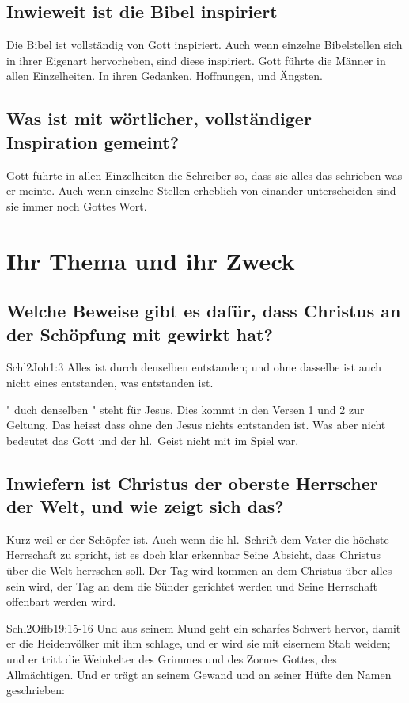 \subsection{Inwieweit ist die Bibel inspiriert}
Die Bibel ist vollständig von Gott inspiriert. Auch wenn einzelne Bibelstellen sich in ihrer Eigenart hervorheben, sind diese inspiriert. Gott führte die Männer in allen Einzelheiten. In ihren Gedanken, Hoffnungen, und Ängsten.
\subsection{Was ist mit wörtlicher, vollständiger Inspiration gemeint?}
Gott führte in allen Einzelheiten die Schreiber so, dass sie alles das schrieben was er meinte. Auch wenn einzelne Stellen erheblich von einander unterscheiden sind sie immer noch Gottes Wort.
\section{Ihr Thema und ihr Zweck}
\subsection{Welche Beweise gibt es dafür, dass Christus an der Schöpfung mit gewirkt hat?}
\begin{bibeltext}{Schl2}{Joh}{1:3}
	Alles ist durch denselben entstanden; und ohne dasselbe ist auch nicht eines entstanden, was entstanden ist.
\end{bibeltext}
" duch denselben " steht für Jesus. Dies kommt in den Versen 1 und 2 zur Geltung. Das heisst dass ohne den Jesus nichts entstanden ist. Was aber nicht bedeutet das Gott und der hl.\ Geist nicht mit im Spiel war.
\subsection{Inwiefern ist Christus der oberste Herrscher der Welt, und wie zeigt sich das?}
	Kurz weil er der Schöpfer ist. Auch wenn die hl.\ Schrift dem Vater die höchste Herrschaft zu spricht, ist es doch klar erkennbar Seine Absicht, dass Christus über die Welt herrschen soll. Der Tag wird kommen an dem Christus über alles sein wird, der Tag an dem die Sünder gerichtet werden und Seine Herrschaft offenbart werden wird.
	\begin{bibeltext}{Schl2}{Offb}{19:15-16}
		Und aus seinem Mund geht ein scharfes Schwert hervor, damit er die Heidenvölker mit ihm schlage, und er wird sie mit eisernem Stab weiden; und er tritt die Weinkelter des Grimmes und des Zornes Gottes, des Allmächtigen. Und er trägt an seinem Gewand und an seiner Hüfte den Namen geschrieben: 
	\end{bibeltext}
